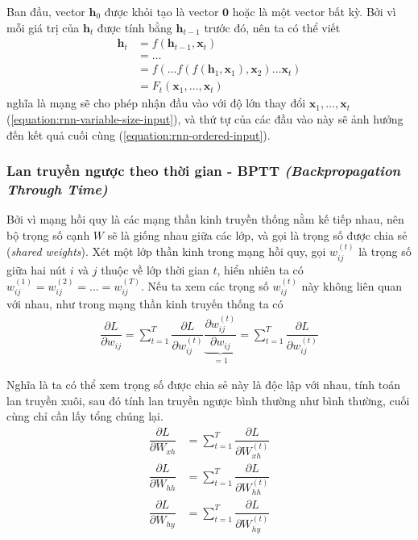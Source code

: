 Ban đầu, vector $\mathbf h_0$ được khỏi tạo là vector $\mathbf 0$ hoặc là một vector bất kỳ. Bởi vì mỗi giá trị của $\mathbf h_t$ được tính bằng $\mathbf h_{t-1}$ trước đó, nên ta có thể viết
\begin{align}
    \mathbf h_t & =f(\mathbf h_{t-1},\mathbf x_t)\nonumber                                                              \\
                & =\dots\nonumber                                                                                       \\
                & =f(\dots f(f(\mathbf h_1,\mathbf x_1),\mathbf x_2)\dots\mathbf x_t)\label{equation:rnn-ordered-input} \\
                & =F_t(\mathbf x_1,\dots,\mathbf x_t)\label{equation:rnn-variable-size-input}
\end{align}
nghĩa là mạng sẽ cho phép nhận đầu vào với độ lớn thay đổi $\mathbf x_1,\dots,\mathbf x_t$ (\ref{equation:rnn-variable-size-input}), và thứ tự của các đầu vào này sẽ ảnh hưởng đến kết quả cuối cùng (\ref{equation:rnn-ordered-input}).

\subsubsection{Lan truyền ngược theo thời gian - BPTT \textit{(Backpropagation Through Time)}}
Bởi vì mạng hồi quy là các mạng thần kinh truyền thống nằm kế tiếp nhau, nên bộ trọng số cạnh $W$ sẽ là giống nhau giữa các lớp, và gọi là trọng số được chia sẻ (\textit{shared weights}). Xét một lớp thần kinh trong mạng hồi quy, gọi $w^{(t)}_{ij}$ là trọng số giữa hai nút $i$ và $j$ thuộc về lớp thời gian $t$, hiển nhiên ta có $w^{(1)}_{ij}=w^{(2)}_{ij}=\dots=w^{(T)}_{ij}$. Nếu ta xem các trọng số $w^{(t)}_{ij}$ này không liên quan với nhau, như trong mạng thần kinh truyến thống ta có
\begin{align}
    \dfrac{\partial L}{\partial w_{ij}}=\sum_{t=1}^T\dfrac{\partial L}{\partial w^{(t)}_{ij}}\underbrace{\dfrac{\partial w^{(t)}_{ij}}{\partial w_{ij}}}_{=1}=\sum_{t=1}^T\dfrac{\partial L}{\partial w^{(t)}_{ij}}
\end{align}

Nghĩa là ta có thể xem trọng số được chia sẻ này là độc lập với nhau, tính toán lan truyền xuôi, sau đó tính lan truyền ngược bình thường như bình thường, cuối cùng chỉ cần lấy tổng chúng lại.
\begin{align}
    \dfrac{\partial L}{\partial W_{xh}} & =\sum_{t=1}^T\dfrac{\partial L}{\partial W_{xh}^{(t)}} \\
    \dfrac{\partial L}{\partial W_{hh}} & =\sum_{t=1}^T\dfrac{\partial L}{\partial W_{hh}^{(t)}} \\
    \dfrac{\partial L}{\partial W_{hy}} & =\sum_{t=1}^T\dfrac{\partial L}{\partial W_{hy}^{(t)}}
\end{align}


